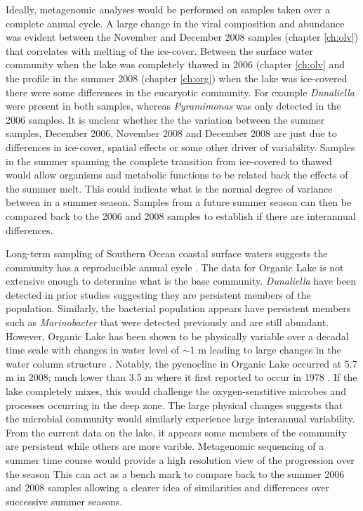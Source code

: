 Ideally, metagenomic analyses would be performed on samples taken over a complete annual cycle.
A large change in the viral composition and abundance was evident between the November and December 2008 samples (chapter \ref{ch:olv}) that correlates with melting of the ice-cover. 
Between the surface water community when the lake was completely thawed in 2006 (chapter \ref{ch:olv} and the profile in the summer 2008 (chapter \ref{ch:org}) when the lake was ice-covered there were some differences in the eucaryotic community.
For example \emph{Dunaliella} were present in both samples, whereas \emph{Pyramimonas} was only detected in the 2006 samples.
It is unclear whether the the variation between the summer samples, December 2006, November 2008 and December 2008 are just due to differences in ice-cover, spatial effects or some other driver of variability.
Samples in the summer spanning the complete transition from ice-covered to thawed would allow organisms and metabolic functions to be related back the effects of the summer melt.
This could indicate what is the normal degree of variance between in a summer season.
Samples from a future summer season can then be compared back to the 2006 and 2008 samples to establish if there are interannual differences.

Long-term sampling of Southern Ocean coastal surface waters suggests the community has a reproducible annual cycle \cite{Murray2007}.
The data for Organic Lake is not extensive enough to determine what is the base community.
\emph{Dunaliella} have been detected in prior studies \cite{Franzmann1987b, Bowman2000b} suggesting they are persistent members of the population.
Similarly, the bacterial population appears have persistent members such as \emph{Marinobacter} that were detected previously \cite{Bowman2000b} and are still abundant. 
However, Organic Lake has been shown to be physically variable over a decadal time scale with changes in water level of $\sim$1 m leading to large changes in the water column structure \cite{Gibson1995, Gibson1996}.
Notably, the pycnocline in Organic Lake occurred at 5.7 m in 2008; much lower than 3.5 m where it first reported to occur in 1978 \cite{Franzmann1987b}.
If the lake completely mixes, this would challenge the oxygen-senstitive microbes and processes occurring in the deep zone.
The large physical changes suggests that the microbial community would similarly experience large interannual variability.
From the current data on the lake, it appears some members of the community are persistent while others are more varible.
Metagenomic sequencing of a summer time course would provide a high resolution view of the progression over the season
This can act as a bench mark to compare back to the summer 2006 and 2008 samples allowing a clearer idea of similarities and differences over successive summer seasons.

